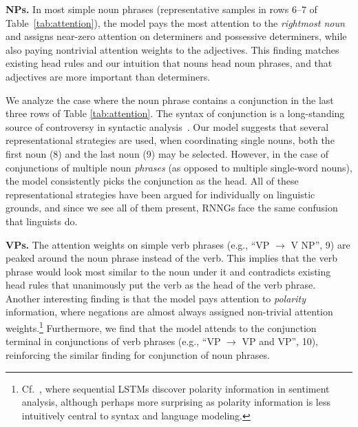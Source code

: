 \documentclass[11pt]{article}
\newcommand{\ask}[1]{\textcolor{orange}{{\textbf{[#1 --\textsc{ask}]}}}}
\newcommand{\nascomment}[1]{\textcolor{blue}{{\textbf{[#1 --\textsc{nas}]}}}}
\newcommand{\miguelcomment}[1]{\textcolor{red}{{\textbf{[#1 --\textsc{miguel}]}}}}
\renewcommand{\ask}[1]{}
\renewcommand{\nascomment}[1]{}
\renewcommand{\miguelcomment}[1]{}
\begin{document}
\textbf{NPs.} In most simple noun phrases (representative samples in rows 6--7 of Table~\ref{tab:attention}), the model pays the most attention to the \emph{rightmost noun} and assigns near-zero attention on determiners and possessive determiners, while also paying nontrivial attention weights to the adjectives. This finding matches existing head rules and our intuition that nouns head noun phrases, and that adjectives are more important than determiners. 

We analyze the case where the noun phrase contains a conjunction in the last three rows of Table \ref{tab:attention}. The syntax of conjunction is a long-standing source of controversy in syntactic analysis~\cite[\emph{inter alia}]{johannessen:1998}. Our model suggests that several representational strategies are used, when coordinating single nouns, both the first noun (8) and the last noun (9) may be selected. However, in the case of conjunctions of multiple noun \emph{phrases} (as opposed to multiple single-word nouns), the model consistently picks the conjunction as the head. All of these representational strategies have been argued for individually on linguistic grounds, and since we see all of them present, RNNGs face the same confusion that linguists do.

\textbf{VPs.} The attention weights on simple verb phrases (e.g., ``VP $\to$ V NP'', 9) are peaked around the noun phrase instead of the verb. This implies that the verb phrase would look most similar to the noun under it and contradicts existing head rules that unanimously put the verb as the head of the verb phrase. 
Another interesting finding is that the model pays attention to \emph{polarity} information, where negations are almost always assigned non-trivial attention weights.\footnote{Cf.~, where sequential LSTMs discover polarity information in sentiment analysis, although perhaps more surprising as polarity information is less intuitively central to syntax and language modeling.} Furthermore, we find that the model attends to the conjunction terminal in conjunctions of verb phrases (e.g., ``VP $\to$ VP and VP'', 10), reinforcing the similar finding for conjunction of noun phrases.
\end{document}
